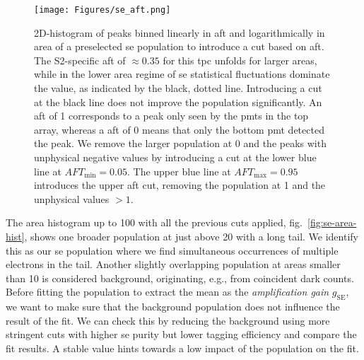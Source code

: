 \begin{figure}
    \centering
    \texttt{[image: Figures/se\_aft.png]}  %
    \caption[AFT vs Area Single Electrons]{
        2D-histogram of peaks binned linearly in \gls{aft} and logarithmically in area of a preselected \gls{se} population to introduce a cut based on \gls{aft}.
        The S2-specific \gls{aft} of $ \approx 0.35 $ for this \gls{tpc} unfolds for larger areas, while in the lower area regime of \gls{se} statistical fluctuations dominate the value, as indicated by the black, dotted line.
        Introducing a cut at the black line does not improve the population significantly.
        An \gls{aft} of 1 corresponds to a peak only seen by the \glspl{pmt} in the top array, whereas a \gls{aft} of 0 means that only the bottom \gls{pmt} detected the peak.
        We remove the larger population at 0 and the peaks with unphysical negative values by introducing a cut at the lower blue line at $ \mathit{AFT}_\mathrm{min} = 0.05 $.
        The upper blue line at $ \mathit{AFT}_\mathrm{max} = 0.95 $ introduces the upper \gls{aft} cut, removing the population at 1 and the unphysical values $ > 1 $.
    }
    \label{fig:se-aft}
\end{figure}

The area histogram up to \SI{100}{} with all the previous cuts applied, fig.~\ref{fig:se-area-hist}, shows one broader population at just above \SI{20}{} with a long tail.
We identify this as our \gls{se} population where we find simultaneous occurrences of multiple electrons in the tail.
Another slightly overlapping population at areas smaller than \SI{10}{} is considered background, originating, e.g., from coincident dark counts.
Before fitting the population to extract the mean as the \emph{amplification gain} $ g_\mathrm{SE} $, we want to make sure that the background population does not influence the result of the fit.
We can check this by reducing the background using more stringent cuts with higher \gls{se} purity but lower tagging efficiency and compare the fit results.
A stable value hints towards a low impact of the population on the fit.

